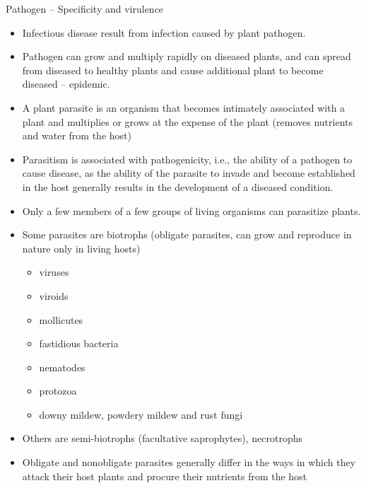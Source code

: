 \documentclass[11pt,dvipsnames,ignorenonframetext,aspectratio=169]{beamer}
\providecommand{\tightlist}{%
  \setlength{\itemsep}{0pt}\setlength{\parskip}{0pt}}
\begin{document}
\begin{frame}{Pathogen -- Specificity and virulence}
\protect\hypertarget{pathogen-specificity-and-virulence}{}
\begin{itemize}
\tightlist
\item
  Infectious disease result from infection caused by plant pathogen.
\item
  Pathogen can grow and multiply rapidly on diseased plants, and can
  spread from diseased to healthy plants and cause additional plant to
  become diseased -- epidemic.
\item
  A plant parasite is an organism that becomes intimately associated
  with a plant and multiplies or grows at the expense of the plant
  (removes nutrients and water from the host)
\item
  Parasitism is associated with pathogenicity, i.e., the ability of a
  pathogen to cause disease, as the ability of the parasite to invade
  and become established in the host generally results in the
  development of a diseased condition.
\end{itemize}
\end{frame}

\begin{frame}{}
\protect\hypertarget{section-5}{}
\begin{itemize}
\tightlist
\item
  Only a few members of a few groups of living organisms can parasitize
  plants.
\item
  Some parasites are biotrophs (obligate parasites, can grow and
  reproduce in nature only in living hosts)

  \begin{itemize}
  \tightlist
  \item
    viruses
  \item
    viroids
  \item
    mollicutes
  \item
    fastidious bacteria
  \item
    nematodes
  \item
    protozoa
  \item
    downy mildew, powdery mildew and rust fungi
  \end{itemize}
\item
  Others are semi-biotrophs (facultative saprophytes), necrotrophs
\item
  Obligate and nonobligate parasites generally differ in the ways in
  which they attack their host plants and procure their nutrients from
  the host
\end{itemize}
\end{frame}
\end{document}
